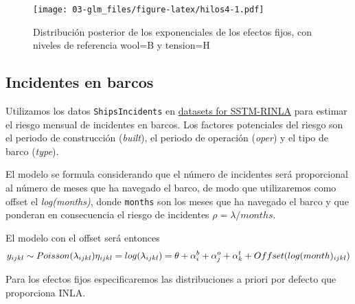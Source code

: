 \documentclass[
]{book}
\begin{document}
\begin{figure}
\centering
\texttt{[image: 03-glm\_files/figure-latex/hilos4-1.pdf]}
\caption{\label{fig:hilos4}Distribución posterior de los exponenciales de los efectos fijos, con niveles de referencia wool=B y tension=H}
\end{figure}

\hypertarget{incidentes-en-barcos}{%
\subsection{Incidentes en barcos}\label{incidentes-en-barcos}}

Utilizamos los datos \texttt{ShipsIncidents} en \href{https://sites.google.com/a/r-inla.org/stbook/datasets}{datasets for
SSTM-RINLA} para
estimar el riesgo mensual de incidentes en barcos. Los factores
potenciales del riesgo son el periodo de construcción (\emph{built}), el
periodo de operación (\emph{oper}) y el tipo de barco (\emph{type}).

El modelo se formula considerando que el número de incidentes será proporcional al número de meses que ha navegado el barco, de modo que utilizaremos como offset el \emph{log(months)}, donde \texttt{months} son los meses que ha navegado el barco y que ponderan en consecuencia el riesgo de incidentes \(\rho=\lambda/months\).

El modelo con el offset será entonces
\[y_{ijkl} \sim Poisson (\lambda_{ijkl} )\\
\eta_{ijkl}=log(\lambda_{ijkl})= \theta + \alpha_i^b+\alpha_j^o+\alpha_k^t+Offset(log(month)_{ijkl})\]

Para los efectos fijos especificaremos las distribuciones a priori por defecto que proporciona INLA.
\end{document}
